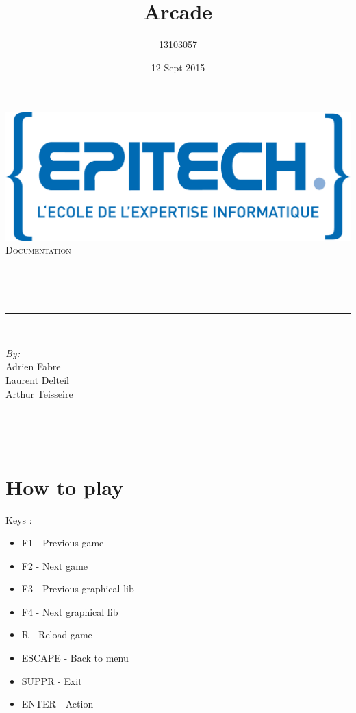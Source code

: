 \documentclass[12pt]{article}
\title{Arcade}								%
\author{13103057}								%
\date{12 Sept 2015}											%
\makeatletter
\let\thetitle\@title
\makeatother
\begin{document}
\begin{titlepage}
	\centering
    \vspace*{0.5 cm}
    \includegraphics[scale = 0.75]{logo-epitech.png}\\[1.0 cm]	%
    \textsc{\LARGE Documentation}\\[2.0 cm]	%
	\rule{\linewidth}{0.2 mm} \\[0.4 cm]
	{ \huge \bfseries \thetitle}\\
	\rule{\linewidth}{0.2 mm} \\[1.5 cm]
	

\vspace{6cm}
	\begin{minipage}{0.7\textwidth}
		\begin{flushleft} \large
			\emph{By:}\\
			Adrien Fabre\\
            Laurent Delteil\\
            Arthur Teisseire\\
			\end{flushleft}
			\end{minipage}~
			\begin{minipage}{0.4\textwidth}
			\begin{flushright} \large

		\end{flushright}
        
	\end{minipage}\\[2 cm]
	
\end{titlepage}


\section{How to play}
Keys :
\begin{itemize}
\item F1 - Previous game
\item F2 - Next game
\item F3 - Previous graphical lib
\item F4 - Next graphical lib
\item R - Reload game
\item ESCAPE - Back to menu
\item SUPPR - Exit
\item ENTER - Action
\end{itemize}
\end{document}
